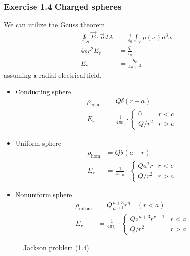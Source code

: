 \documentclass[10pt,a4paper]{article}
\theoremstyle{definition}
\begin{document}
\subsubsection{Exercise 1.4 Charged spheres}
We can utilize the Gauss theorem
\begin{align}
\oint_S\vec{E}\cdot\vec{n}dA&=\frac{1}{\epsilon_0}\int_V\rho(x)d^3x\\
4\pi r^2E_r&=\frac{q_r}{\epsilon_0}\\
E_r&=\frac{q_r}{4\pi\epsilon_0r^2}
\end{align}
assuming a radial electrical field.
\begin{itemize}
\item Conducting sphere
\begin{align}
\rho_\text{cond}&=Q\delta(r-a)\\
E_r&=\frac{1}{4\pi\epsilon_0}\cdot\left\{
\begin{array}{ll}
0 & r<a\\
Q/r^2 & r>a
\end{array}
\right.
\end{align}

\item Uniform sphere
\begin{align}
\rho_\text{hom}&=Q\theta(a-r)\\
E_r&=\frac{1}{4\pi\epsilon_0}\cdot\left\{
\begin{array}{ll}
Qa^3r & r<a\\
Q/r^2 & r>a
\end{array}
\right.
\end{align}

\item Nonuniform sphere
\begin{align}
\rho_\text{inhom}&=Q\frac{n+3}{a^{n+3}}r^n\quad(r<a)\\
E_r&=\frac{1}{4\pi\epsilon_0}\cdot\left\{
\begin{array}{ll}
Qa^{n+3}r^{n+1} & r<a\\
Q/r^2 & r>a
\end{array}
\right.
\end{align}
\end{itemize}
\begin{figure}[!h]
\centering
{}
\caption{Jackson problem (1.4)}
\end{figure}
\end{document}
